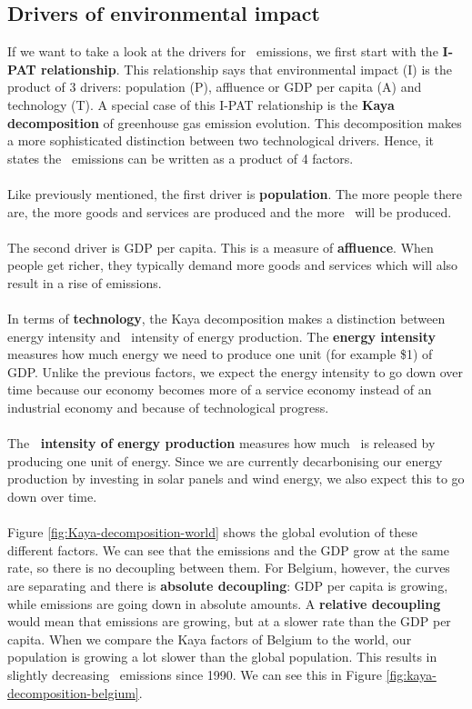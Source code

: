 \documentclass[../summary.tex]{subfiles}
\begin{document}
\subsection{Drivers of environmental impact}

If we want to take a look at the drivers for \COtwo\ emissions, we first start with the \textbf{I-PAT relationship}. This relationship says that environmental impact (I) is the product of 3 drivers: population (P), affluence or GDP per capita (A) and technology (T). A special case of this I-PAT relationship is the \textbf{Kaya decomposition} of greenhouse gas emission evolution. This decomposition makes a more sophisticated distinction between two technological drivers. Hence, it states the \COtwo\ emissions can be written as a product of 4 factors.
\\\\
Like previously mentioned, the first driver is \textbf{population}. The more people there are, the more goods and services are produced and the more \COtwo\ will be produced.
\\\\
The second driver is GDP per capita. This is a measure of \textbf{affluence}. When people get richer, they typically demand more goods and services which will also result in a rise of emissions.
\\\\
In terms of \textbf{technology}, the Kaya decomposition makes a distinction between energy intensity and \COtwo\ intensity of energy production. The \textbf{energy intensity} measures how much energy we need to produce one unit (for example \$1) of GDP. Unlike the previous factors, we expect the energy intensity to go down over time because our economy becomes more of a service economy instead of an industrial economy and because of technological progress.
\\\\
The \textbf{\boldmath \COtwo\ intensity of energy production} measures how much \COtwo\ is released by producing one unit of energy. Since we are currently decarbonising our energy production by investing in solar panels and wind energy, we also expect this to go down over time.
\\\\
Figure \ref{fig:Kaya-decomposition-world} shows the global evolution of these different factors. We can see that the emissions and the GDP grow at the same rate, so there is no decoupling between them. For Belgium, however, the curves are separating and there is \textbf{absolute decoupling}: GDP per capita is growing, while emissions are going down in absolute amounts. A \textbf{relative decoupling} would mean that emissions are growing, but at a slower rate than the GDP per capita. When we compare the Kaya factors of Belgium to the world, our population is growing a lot slower than the global population. This results in slightly decreasing \COtwo\ emissions since 1990. We can see this in Figure \ref{fig:kaya-decomposition-belgium}.
\end{document}
